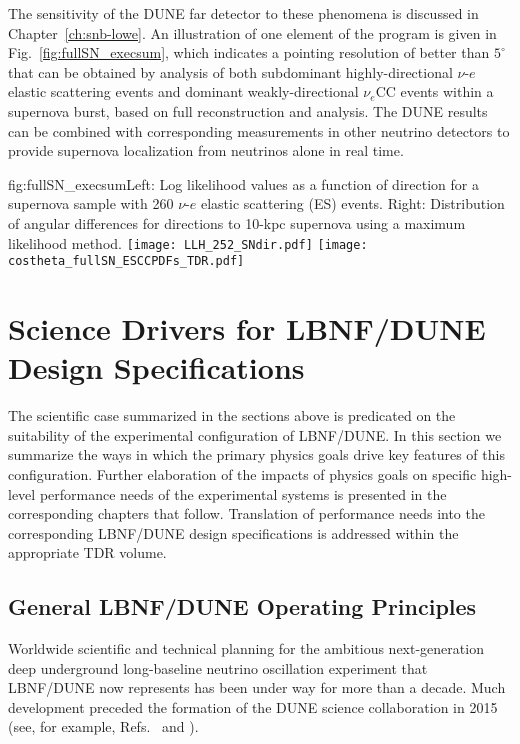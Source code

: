 The sensitivity of the DUNE far detector to these 
phenomena is discussed in Chapter~\ref{ch:snb-lowe}. An illustration 
of one element of the program is given in Fig.~\ref{fig:fullSN_execsum}, 
which indicates a pointing resolution of better than $5^\circ$ that 
can be obtained by analysis of both subdominant highly-directional $\nu$-$e$ elastic scattering 
events and dominant weakly-directional $\nu_e$CC events within a supernova burst, based 
on full reconstruction and analysis. The DUNE results can be 
combined with corresponding measurements in other neutrino detectors to 
provide supernova localization from neutrinos alone in real time.
%
\begin{dunefigure}{fig:fullSN_execsum}{Left: Log
    likelihood values as a function of direction for a
    supernova sample with 260 $\nu$-$e$ elastic scattering (ES) events.  Right: Distribution of angular differences for
    directions to 10-kpc supernova using a maximum likelihood
    method.}
  \texttt{[image: LLH\_252\_SNdir.pdf]}
  \texttt{[image: costheta\_fullSN\_ESCCPDFs\_TDR.pdf]}
\end{dunefigure}

\section{Science Drivers for LBNF/DUNE Design Specifications}
\label{sec:exec-key-reqs}

The scientific case summarized in the sections above
is predicated on the suitability of the experimental
configuration of LBNF/DUNE.  In this section we summarize
the ways in which the primary physics goals drive key features
of this configuration.  Further elaboration of the impacts of
physics goals on specific high-level performance needs of the
experimental systems is presented in the corresponding chapters
that follow.  Translation of performance needs into the
corresponding LBNF/DUNE design specifications is addressed within
the appropriate TDR volume.

\subsection{General LBNF/DUNE Operating Principles}

Worldwide scientific and technical planning for the
ambitious next-generation deep underground long-baseline
neutrino oscillation experiment that LBNF/DUNE now represents
has been under way for more than a decade.  Much
development preceded the formation of the DUNE science
collaboration in 2015 (see, for example,
Refs.~\cite{Adams:2013qkq} and \cite{LAGUNA-LBNO-deliv}).

